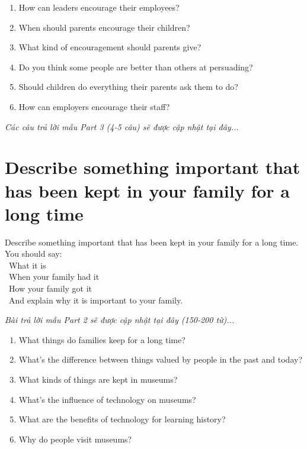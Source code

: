 \begin{ieltsprompt}
\begin{enumerate}[itemsep=4pt]
    \item How can leaders encourage their employees?
    \item When should parents encourage their children?
    \item What kind of encouragement should parents give?
    \item Do you think some people are better than others at persuading?
    \item Should children do everything their parents ask them to do?
    \item How can employers encourage their staff?
\end{enumerate}
\end{ieltsprompt}

\vspace{1em}
\textit{Các câu trả lời mẫu Part 3 (4-5 câu) sẽ được cập nhật tại đây...}
\vspace{2em}

\section{Describe something important that has been kept in your family for a long time}
\begin{ieltsprompt}
Describe something important that has been kept in your family for a long time. \\
You should say: \\
\textbullet\ What it is \\
\textbullet\ When your family had it \\
\textbullet\ How your family got it \\
\textbullet\ And explain why it is important to your family. \\
\end{ieltsprompt}

\vspace{1em}
\textit{Bài trả lời mẫu Part 2 sẽ được cập nhật tại đây (150-200 từ)...}
\vspace{2em}

\begin{ieltsprompt}
\begin{enumerate}[itemsep=4pt]
    \item What things do families keep for a long time?
    \item What's the difference between things valued by people in the past and today?
    \item What kinds of things are kept in museums?
    \item What's the influence of technology on museums?
    \item What are the benefits of technology for learning history?
    \item Why do people visit museums?
\end{enumerate}
\end{ieltsprompt}

